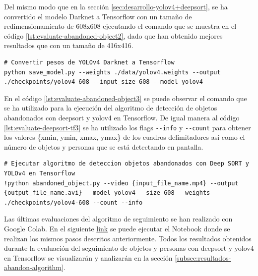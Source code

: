 Del mismo modo que en la sección \ref{sec:desarrollo-yolov4+deepsort}, se ha convertido el modelo Darknet a Tensorflow con un tamaño de redimensionamiento de 608x608 ejecutando el comando que se muestra en el código \ref{lst:evaluate-abandoned-object2}, dado que han obtenido mejores resultados que con un tamaño de 416x416.

\vspace{0.5cm}
\begin{lstlisting}[language=iPython,caption=Evaluación de la detección de objetos abandonados con DeepSORT y YOLOv4 en Tensorflow (2),captionpos=b,label={lst:evaluate-abandoned-object2}]
# Convertir pesos de YOLOv4 Darknet a Tensorflow
python save_model.py --weights ./data/yolov4.weights --output ./checkpoints/yolov4-608 --input_size 608 --model yolov4
\end{lstlisting}

En el código \ref{lst:evaluate-abandoned-object3} se puede observar el comando que se ha utilizado para la ejecución del algoritmo de detección de objetos abandonados con \gls{deepsort} y \gls{yolov4} en Tensorflow. De igual manera al código \ref{lst:evaluate-deepsort-tf3} se ha utilizado los flags \texttt{-{}-info} y \texttt{-{}-count} para obtener los valores \{xmin, ymin, xmax, ymax\} de los cuadros delimitadores así como el número de objetos y personas que se está detectando en pantalla.

\vspace{0.5cm}
\begin{lstlisting}[language=iPython,caption=Evaluación de la detección de objetos abandonados con DeepSORT y YOLOv4 en Tensorflow (3),captionpos=b,label={lst:evaluate-abandoned-object3}]
# Ejecutar algoritmo de deteccion objetos abandonados con Deep SORT y YOLOv4 en Tensorflow
!python abandoned_object.py --video {input_file_name.mp4} --output {output_file_name.avi} --model yolov4 --size 608 --weights ./checkpoints/yolov4-608 --count --info
\end{lstlisting}

Las últimas evaluaciones del algoritmo de seguimiento se han realizado con Google Colab. En el siguiente \href{https://colab.research.google.com/drive/18vL9LH8e9VaimA9LzBD35Cn4AOm6C17I?usp=sharing}{link} se puede ejecutar el Notebook donde se realizan los mismos pasos descritos anteriormente. Todos los resultados obtenidos durante la evaluación del seguimiento de objetos y personas con \gls{deepsort} y \gls{yolov4} en Tensorflow se visualizarán y analizarán en la sección \ref{subsec:resultados-abandon-algorithm}.

